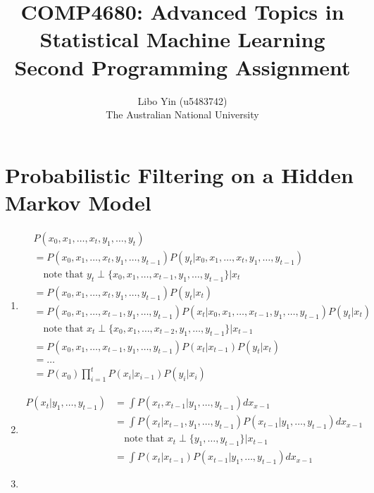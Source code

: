 \documentclass[11pt, a4paper]{article}
\begin{document}
\title{COMP4680: Advanced Topics in Statistical Machine Learning\\Second Programming Assignment}
\author{Libo Yin (u5483742)\\The Australian National University}
\maketitle

\section{Probabilistic Filtering on a Hidden Markov Model}

\begin{enumerate}[topsep=0em, itemsep=-1ex, partopsep=1ex, parsep=1ex, label=(\alph*)]
\item
\begin{align*}
&P(x_0, x_1, \ldots, x_t, y_1, \ldots, y_t)\\
&=P(x_0, x_1, \ldots, x_t, y_1, \ldots, y_{t-1})P(y_t|x_0, x_1, \ldots, x_t, y_1, \ldots, y_{t-1})\\
&\quad\text{note that }y_t\perp\{x_0, x_1, \ldots, x_{t-1}, y_1, \ldots, y_{t-1}\}|x_t\\
&=P(x_0, x_1, \ldots, x_t, y_1, \ldots, y_{t-1})P(y_t|x_t)\\
&=P(x_0, x_1, \ldots, x_{t-1}, y_1, \ldots, y_{t-1})P(x_t|x_0, x_1, \ldots, x_{t-1}, y_1, \ldots, y_{t-1})P(y_t|x_t)\\
&\quad\text{note that }x_t\perp\{x_0, x_1, \ldots, x_{t-2}, y_1, \ldots, y_{t-1}\}|x_{t-1}\\
&=P(x_0, x_1, \ldots, x_{t-1}, y_1, \ldots, y_{t-1})P(x_t|x_{t-1})P(y_t|x_t)\\
&=\ldots\\
&=P(x_0)\prod_{i=1}^t P(x_i|x_{i-1})P(y_i|x_i)
\end{align*}
\item
\begin{align*}
P(x_t|y_1, \ldots, y_{t-1})&=\int P(x_t, x_{t-1}|y_1, \ldots, y_{t-1})dx_{x-1}\\
&=\int P(x_t|x_{t-1}, y_1, \ldots, y_{t-1})P(x_{t-1}|y_1, \ldots, y_{t-1})dx_{x-1}\\
&\quad\text{note that }x_t\perp\{y_1, \ldots, y_{t-1}\}|x_{t-1}\\
&=\int P(x_t|x_{t-1})P(x_{t-1}|y_1, \ldots, y_{t-1})dx_{x-1}
\end{align*}
\item
\begin{align*}

\end{align*}
\end{enumerate}
\end{document}
